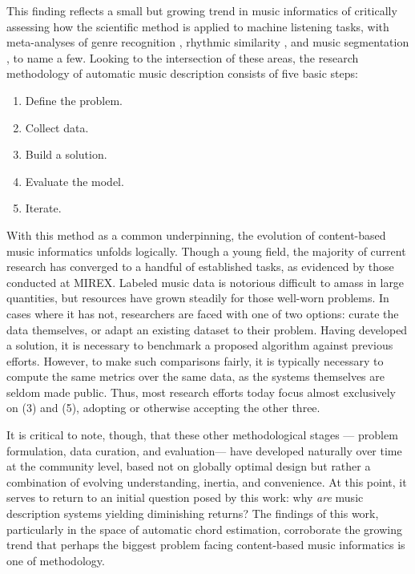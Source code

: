 This finding reflects a small but growing trend in music informatics of critically assessing how the scientific method is applied to machine listening tasks, with meta-analyses of genre recognition \cite{Sturm2014Simple}, rhythmic similarity \cite{Esparza2014Genre}, and music segmentation \cite{Nieto2015Segmentation}, to name a few.
Looking to the intersection of these areas, the research methodology of automatic music description consists of five basic steps:

\begin{enumerate}
\item Define the problem.
\item Collect data.
\item Build a solution.
\item Evaluate the model.
\item Iterate.
\end{enumerate}

With this method as a common underpinning, the evolution of content-based music informatics unfolds logically.
Though a young field, the majority of current research has converged to a handful of established tasks, as evidenced by those conducted at MIREX.
Labeled music data is notorious difficult to amass in large quantities, but resources have grown steadily for those well-worn problems.
In cases where it has not, researchers are faced with one of two options:
curate the data themselves, or adapt an existing dataset to their problem.
Having developed a solution, it is necessary to benchmark a proposed algorithm against previous efforts.
However, to make such comparisons fairly, it is typically necessary to compute the same metrics over the same data, as the systems themselves are seldom made public.
Thus, most research efforts today focus almost exclusively on (3) and (5), adopting or otherwise accepting the other three.

It is critical to note, though, that these other methodological stages --- problem formulation, data curation, and evaluation--- have developed naturally over time at the community level, based not on globally optimal design but rather a combination of evolving understanding, inertia, and convenience.
At this point, it serves to return to an initial question posed by this work:
why \emph{are} music description systems yielding diminishing returns?
The findings of this work, particularly in the space of automatic chord estimation, corroborate the growing trend that perhaps the biggest problem facing content-based music informatics is one of methodology.

